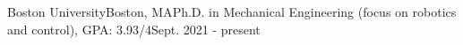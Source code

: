 \begin{rSubsection}
{Boston University}{Boston, MA}{Ph.D. in Mechanical Engineering (focus on robotics and control), GPA: 3.93/4}{Sept. 2021 - present}
\end{rSubsection}
\vspace{0.11cm}